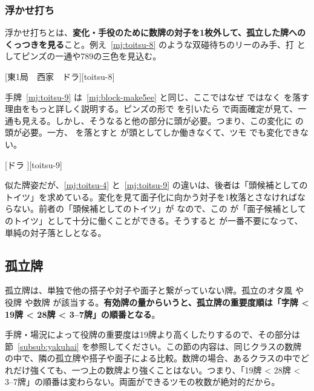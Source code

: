 \documentclass[../nankiru_main.tex]{subfiles}
\begin{document}
\subsubsection*{浮かせ打ち}

浮かせ打ちとは、\textbf{変化・手役のために数牌の対子を1枚外して、孤立した牌へのくっつきを見る}こと。例え~\ref{mj:toitsu-8} のような双碰待ちのリーのみ手、打  としてピンズの一通や789の三色を見込む。

[東1局　西家　ドラ][toitsu-8]

手牌~\ref{mj:toitsu-9} は~\ref{mj:block-make5ee} と同じ、ここではなぜ  ではなく  を落す理由をもっと詳しく説明する。ピンズの形で  を引いたら  で両面確定が見て、一通も見える。しかし、そうなると他の部分に頭が必要。つまり、この変化に  の頭が必要。一方、 を落とすと  が頭としてしか働きなくて、ツモ  でも変化できない。

[ドラ ][toitsu-9]

似た牌姿だが、\ref{mj:toitsu-4} と~\ref{mj:toitsu-9} の違いは、後者は「頭候補としてのトイツ」を求めている。変化を見て面子化に向かう対子を1枚落とさなければならない。前者の「頭候補としてのトイツ」が  なので、この  が「面子候補としてのトイツ」として十分に働くことができる。そうすると  が一番不要になって、単純の対子落としとなる。

\subsection{孤立牌} \label{subsec:lonetile}

孤立牌は、単独で他の搭子や対子や面子と繋がっていない牌。孤立のオタ風  や役牌  や数牌  が該当する。\textbf{有効牌の量からいうと、孤立牌の重要度順は「字牌 \textless{} 19牌 \textless{} 28牌 \textless{} 3--7牌」の順番となる}\citep{clearrain-floater}。

手牌・場況によって役牌の重要度は19牌より高くしたりするので、その部分は節~\ref{subsub:yakuhai} を参照してください。この節の内容は、同じクラスの数牌の中で、隣の孤立牌や搭子や面子による比較。数牌の場合、あるクラスの中でどれだけ強くても、一つ上の数牌より強くことはない。つまり、「19牌 \textless{} 28牌 \textless{} 3--7牌」の順番は変わらない。両面ができるツモの枚数が絶対的だから。

\end{document}
